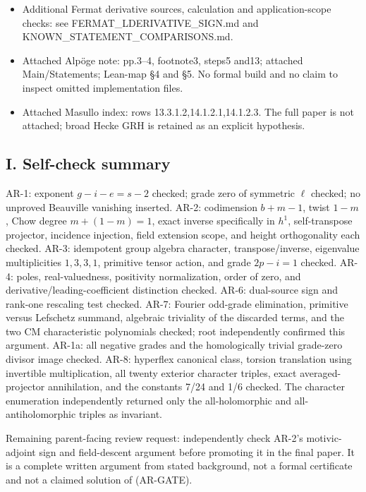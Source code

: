 \begin{itemize}
  Gu 2026: https://arxiv.org/abs/2609.33223 . Local primary v2 read at
  work/references/Gu2026.pdf/.txt: Theorem 1.3, Proposition 5.3, §2.2
  and Corollary 1.6; root's complete AR-10 proof independently checked
  against these statements.
\item
  Additional Fermat derivative sources, calculation and
  application-scope checks: see FERMAT\_LDERIVATIVE\_SIGN.md and
  KNOWN\_STATEMENT\_COMPARISONS.md.
\item
  Attached Alpöge note: pp.3--4, footnote3, steps5 and13; attached
  Main/Statements; Lean-map §4 and §5. No formal build and no claim to
  inspect omitted implementation files.
\item
  Attached Masullo index: rows 13.3.1.2,14.1.2.1,14.1.2.3. The full
  paper is not attached; broad Hecke GRH is retained as an explicit
  hypothesis.
\end{itemize}

\subsection{I. Self-check summary}\label{i.-self-check-summary}

AR-1: exponent \(g-i-e=s-2\) checked; grade zero of symmetric \(\ell\)
checked; no unproved Beauville vanishing inserted. AR-2: codimension
\(b+m-1\), twist \(1-m\), Chow degree \(m+(1-m)=1\), exact inverse
specifically in \(h^1\), self-transpose projector, incidence injection,
field extension scope, and height orthogonality each checked. AR-3:
idempotent group algebra character, transpose/inverse, eigenvalue
multiplicities \(1,3,3,1\), primitive tensor action, and grade
\(2p-i=1\) checked. AR-4: poles, real-valuedness, positivity
normalization, order of zero, and derivative/leading-coefficient
distinction checked. AR-6: dual-source sign and rank-one rescaling test
checked. AR-7: Fourier odd-grade elimination, primitive versus Lefschetz
summand, algebraic triviality of the discarded terms, and the two CM
characteristic polynomials checked; root independently confirmed this
argument. AR-1a: all negative grades and the homologically trivial
grade-zero divisor image checked. AR-8: hyperflex canonical class,
torsion translation using invertible multiplication, all twenty exterior
character triples, exact averaged-projector annihilation, and the
constants 7/24 and 1/6 checked. The character enumeration independently
returned only the all-holomorphic and all-antiholomorphic triples as
invariant.

Remaining parent-facing review request: independently check AR-2's
motivic-adjoint sign and field-descent argument before promoting it in
the final paper. It is a complete written argument from stated
background, not a formal certificate and not a claimed solution of
(AR-GATE).
